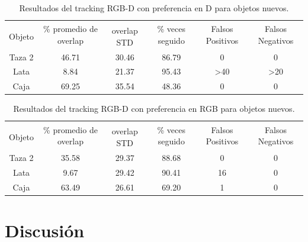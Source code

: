 \begin{table}
    \begin{tabular}{|c|c|c|c|c|c|}
    \hline
    & \multirow{2}{2.4cm}{\% promedio de overlap} & & \multirow{2}{2cm}{\% veces seguido} & \multirow{2}{1.6cm}{Falsos Positivos} & \multirow{2}{1.6cm}{Falsos Negativos}\\
	Objeto & & overlap STD & & &\\
    \hline
    Taza 2  & 46.71      & 30.46       & 86.79             & 0                & 0\\
    \hline
    Lata    &  8.84      & 21.37       & 95.43             & >40              & >20\\
    \hline
    Caja    & 69.25      & 35.54       & 48.36             & 0                & 0\\
    \hline
    \end{tabular}
\caption{Resultados del tracking RGB-D con preferencia en D para objetos nuevos.}
\label{tabla_rgbd_d_nuevos}
\end{table}

\begin{table}
    \begin{tabular}{|c|c|c|c|c|c|}
    \hline
    & \multirow{2}{2.4cm}{\% promedio de overlap} & & \multirow{2}{2cm}{\% veces seguido} & \multirow{2}{1.6cm}{Falsos Positivos} & \multirow{2}{1.6cm}{Falsos Negativos}\\
	Objeto & & overlap STD & & &\\
    \hline
    Taza 2  & 35.58      & 29.37       & 88.68             & 0                & 0\\
    \hline
    Lata    &  9.67      & 29.42       & 90.41             & 16               & 0\\
    \hline
    Caja    & 63.49      & 26.61       & 69.20             & 1                & 0\\
    \hline
    \end{tabular}
\caption{Resultados del tracking RGB-D con preferencia en RGB para objetos nuevos.}
\label{tabla_rgbd_rgb_nuevos}
\end{table}




\section{Discusión}